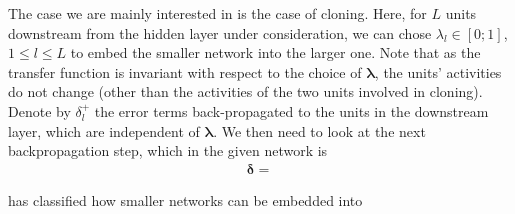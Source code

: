 \documentclass{article}
\newcommand{\vLambda}{{\boldsymbol \lambda}}
\newcommand{\vDelta}{{\boldsymbol \delta}}
\begin{document}
The case we are mainly interested in is the case of cloning. Here, for $L$ units downstream from the hidden layer under consideration, we can chose $\lambda_l \in [0;1]$, $1 \leq l \leq L$ to embed the smaller network into the larger one. Note that as the transfer function is invariant with respect to the choice of $\vLambda$, the units' activities do not change (other than the activities of the two units involved in cloning). Denote by $\delta^+_l$ the error terms back-propagated to the units in the downstream layer, which are independent of $\vLambda$.  We then need to look at the next backpropagation step, which in the given network is  
\begin{align}
\vDelta = 
\end{align}

\newpage

has classified how smaller networks can be embedded into 



\end{document}
